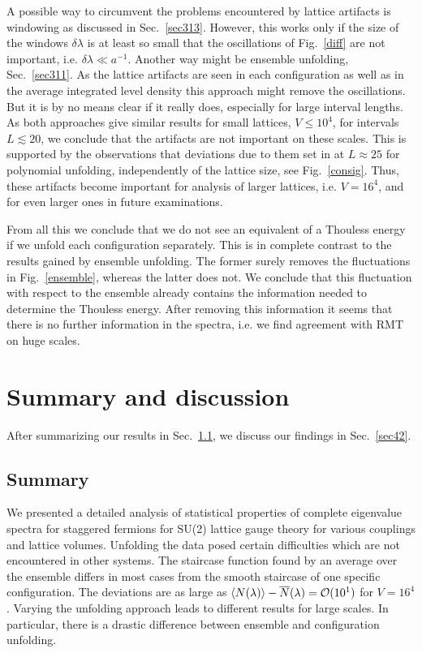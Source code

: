 A possible way to circumvent the problems encountered by lattice
artifacts is windowing as discussed in Sec.~\ref{sec313}.  However,
this works only if the size of the windows $\delta\lambda$ is at least
so small that the oscillations of Fig.~\ref{diff} are not important,
i.e. $\delta\lambda\ll a^{-1}$. Another way might be ensemble
unfolding, Sec.~\ref{sec311}. As the lattice artifacts are seen in each
configuration as well as in the average integrated level density this
approach might remove the oscillations. But it is by no means clear if
it really does, especially for large interval lengths.  As both
approaches give similar results for small lattices, $V\leq10^4$, for
intervals $L\lesssim20$, we conclude that the artifacts are not
important on these scales. This is supported by the observations that
deviations due to them set in at $L\approx25$ for polynomial
unfolding, independently of the lattice size, see Fig.~\ref{consig}.
Thus, these artifacts become important for analysis of larger
lattices, i.e. $V=16^4$, and for even larger ones in future
examinations.

From all this we conclude that we do not see an equivalent of a
Thouless energy if we unfold each configuration separately.  This is
in complete contrast to the results gained by ensemble unfolding. The
former surely removes the fluctuations in Fig.~\ref{ensemble}, whereas
the latter does not. We conclude that this fluctuation with respect to
the ensemble already contains the information needed to determine the
Thouless energy. After removing this information it seems that there
is no further information in the spectra, i.e. we find agreement with
RMT on huge scales.

\section{Summary and discussion}
\label{sec4}

After summarizing our results in Sec.~\ref{sec41}, we discuss our
findings in Sec.~\ref{sec42}.

\subsection{Summary}
\label{sec41}

We presented a detailed analysis of statistical properties of complete
eigenvalue spectra for staggered fermions for SU(2) lattice gauge
theory for various couplings and lattice volumes. Unfolding the data
posed certain difficulties which are not encountered in other systems.
The staircase function found by an average over the ensemble differs
in most cases from the smooth staircase of one specific configuration.
The deviations are as large as $\langle
N(\lambda)\rangle-\overline{N}(\lambda)={\cal O}(10^1)$ for $V=16^4$.
Varying the unfolding approach leads to different results for large
scales. In particular, there is a drastic difference between ensemble
and configuration unfolding.

